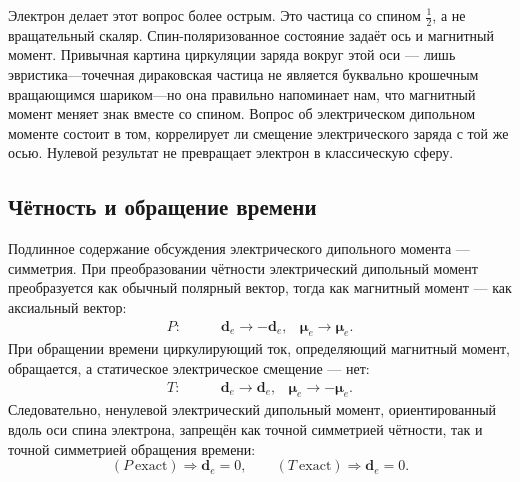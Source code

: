 Электрон делает этот вопрос более острым. Это частица со спином \(\tfrac12\), а не вращательный скаляр. Спин-поляризованное состояние задаёт ось и магнитный момент. Привычная картина циркуляции заряда вокруг этой оси — лишь эвристика---точечная дираковская частица не является буквально крошечным вращающимся шариком---но она правильно напоминает нам, что магнитный момент меняет знак вместе со спином. Вопрос об электрическом дипольном моменте состоит в том, коррелирует ли смещение электрического заряда с той же осью. Нулевой результат не превращает электрон в классическую сферу.

\begin{classroomqa}
\end{classroomqa}

\begin{classroomqa}
\end{classroomqa}

\subsection{Чётность и обращение времени}

Подлинное содержание обсуждения электрического дипольного момента — симметрия. При преобразовании чётности электрический дипольный момент преобразуется как обычный полярный вектор, тогда как магнитный момент — как аксиальный вектор:
\begin{align}
P:\qquad &\mathbf d_e \to -\mathbf d_e,
&\boldsymbol{\mu}_e \to \boldsymbol{\mu}_e .
\end{align}
При обращении времени циркулирующий ток, определяющий магнитный момент, обращается, а статическое электрическое смещение — нет:
\begin{align}
T:\qquad &\mathbf d_e \to \mathbf d_e,
&\boldsymbol{\mu}_e \to -\boldsymbol{\mu}_e .
\end{align}
Следовательно, ненулевой электрический дипольный момент, ориентированный вдоль оси спина электрона, запрещён как точной симметрией чётности, так и точной симметрией обращения времени:
\begin{equation}
(P\ \text{exact}) \Rightarrow \mathbf d_e=0,
\qquad
(T\ \text{exact}) \Rightarrow \mathbf d_e=0.
\end{equation}

